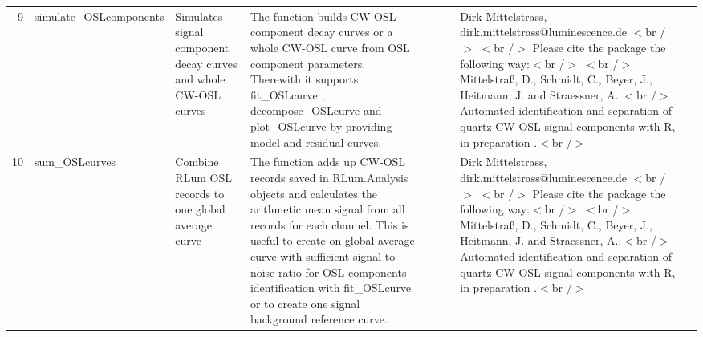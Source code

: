 \begin{table}[ht]
\begin{tabular}{rllllllll}
  9 & simulate\_OSLcomponents & Simulates signal component decay curves and whole CW-OSL curves & The function builds CW-OSL component decay curves or a whole CW-OSL curve from OSL component parameters. Therewith it supports  fit\_OSLcurve ,  decompose\_OSLcurve  and  plot\_OSLcurve  by providing model and residual curves. &  &  &  & Dirk Mittelstrass,  dirk.mittelstrass@luminescence.de $<$br /$>$ $<$br /$>$ Please cite the package the following way:$<$br /$>$ $<$br /$>$ Mittelstraß, D., Schmidt, C., Beyer, J., Heitmann, J. and Straessner, A.:$<$br /$>$ Automated identification and separation of quartz CW-OSL signal components with R,  in preparation .$<$br /$>$ &  \\ 
  10 & sum\_OSLcurves & Combine RLum OSL records to one global average curve & The function adds up CW-OSL records saved in  RLum.Analysis  objects and calculates the arithmetic mean signal from all records for each channel. This is useful to create on global average curve with sufficient signal-to-noise ratio for OSL components identification with  fit\_OSLcurve  or to create one signal background reference curve. &  &  &  & Dirk Mittelstrass,  dirk.mittelstrass@luminescence.de $<$br /$>$ $<$br /$>$ Please cite the package the following way:$<$br /$>$ $<$br /$>$ Mittelstraß, D., Schmidt, C., Beyer, J., Heitmann, J. and Straessner, A.:$<$br /$>$ Automated identification and separation of quartz CW-OSL signal components with R,  in preparation .$<$br /$>$ &  \\ 
   \hline
\end{tabular}
\end{table}

